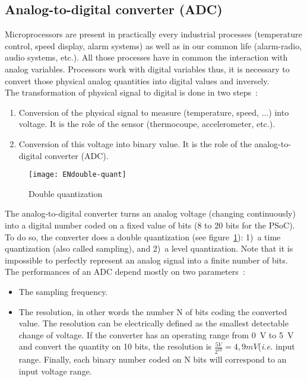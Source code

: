 \newpage
\subsection{Analog-to-digital converter (ADC)}

Microprocessors are present in practically every industrial processes (temperature control, speed display, alarm systems) as well as in our common life (alarm-radio, audio systems, etc.). All those processes have in common the interaction with analog variables. Processors work with digital variables thus, it is necessary to convert those physical analog quantities into digital values and inversely.
\\
The transformation of physical signal to digital is done in two steps~:
\begin{enumerate}
	\item Conversion of the physical signal to measure (temperature, speed, ...) into voltage. It is the role of the sensor (thermocoupe, accelerometer, etc.).
	\item Conversion of this voltage into binary value. It is the role of the analog-to-digital converter (ADC).
\end{enumerate}
\begin{figure}[h]
	\centering
	\texttt{[image: ENdouble-quant]}
	\caption{Double quantization}
	\label{fig:double-quant}
\end{figure}
The analog-to-digital converter turns an analog voltage (changing continuously) into a digital number coded on a fixed value of bits (8 to 20 bits for the PSoC).
To do so, the converter does a double quantization (see figure~\ref{fig:double-quant}): 1)~a time quantization (also called sampling), and 2)~a level quantization. Note that it is impossible to perfectly represent an analog signal into a finite number of bits.
\\
The performances of an ADC depend mostly on two parameters~:
\begin{itemize}
	\item The sampling frequency.
	\item The resolution, in other words the number N of bits coding the converted value.
    The resolution can be electrically defined as the smallest detectable change of voltage.
    If the converter has an operating range from 0~V to 5~V and convert the quantity on 10 bits, the resolution is $\frac{5 V}{2^{10}} = 4,9 mV$(\textit{i.e.} input range.
    Finally, each binary number coded on N bits will correspond to an input voltage range.
\end{itemize}


